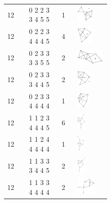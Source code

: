 \begin{footnotesize}
\begin{longtable}{m{0.07\linewidth} m{0.15\linewidth} m{0.05\linewidth} m{0.15\linewidth}}
12 & 0 2 2 3 3 4 5 5 & 1 & \includegraphics[height=0.8cm]{15-universal-graphs/img/degree-sequences-example-graphs/graph-4-8-7}\\
12 & 0 2 2 3 4 4 4 5 & 4 & \includegraphics[height=0.8cm]{15-universal-graphs/img/degree-sequences-example-graphs/graph-4-8-8}\\
12 & 0 2 3 3 3 3 5 5 & 2 & \includegraphics[height=0.8cm]{15-universal-graphs/img/degree-sequences-example-graphs/graph-4-8-9}\\
12 & 0 2 3 3 3 4 4 5 & 2 & \includegraphics[height=0.8cm]{15-universal-graphs/img/degree-sequences-example-graphs/graph-4-8-10}\\
12 & 0 2 3 3 4 4 4 4 & 1 & \includegraphics[height=0.8cm]{15-universal-graphs/img/degree-sequences-example-graphs/graph-4-8-11}\\
12 & 1 1 2 3 4 4 4 5 & 6 & \includegraphics[height=0.8cm]{15-universal-graphs/img/degree-sequences-example-graphs/graph-4-8-12}\\
12 & 1 1 2 4 4 4 4 4 & 1 & \includegraphics[height=0.8cm]{15-universal-graphs/img/degree-sequences-example-graphs/graph-4-8-13}\\
12 & 1 1 3 3 3 4 4 5 & 2 & \includegraphics[height=0.8cm]{15-universal-graphs/img/degree-sequences-example-graphs/graph-4-8-14}\\
12 & 1 1 3 3 4 4 4 4 & 2 & \includegraphics[height=0.8cm]{15-universal-graphs/img/degree-sequences-example-graphs/graph-4-8-15}\\

\end{longtable}
\end{footnotesize}
